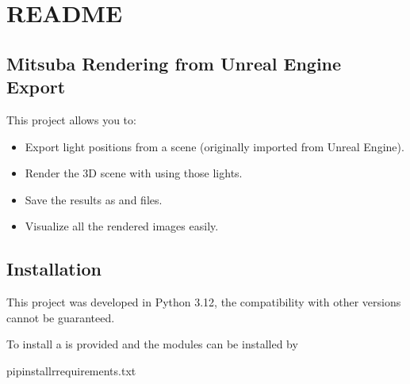 \documentclass[letterpaper,10pt,english]{sphinxmanual}
\begin{document}
\chapter{README}
\label{\detokenize{index:readme}}

\section{Mitsuba Rendering from Unreal Engine Export}
\label{\detokenize{index:mitsuba-rendering-from-unreal-engine-export}}
\sphinxAtStartPar
This project allows you to:
\begin{itemize}
\item {} 
\sphinxAtStartPar
Export light positions from a  scene (originally imported from Unreal Engine).

\item {} 
\sphinxAtStartPar
Render the 3D scene with  using those lights.

\item {} 
\sphinxAtStartPar
Save the results as  and  files.

\item {} 
\sphinxAtStartPar
Visualize all the rendered images easily.

\end{itemize}


\section{Installation}
\label{\detokenize{index:installation}}
\sphinxAtStartPar
This project was developed in Python 3.12, the compatibility with other versions cannot be guaranteed.

\sphinxAtStartPar
To install a  is provided and the modules can be installed by

\begin{sphinxVerbatim}[commandchars=\\\{\}]
pipinstall\PYGZhy{}rrequirements.txt
\end{sphinxVerbatim}
\end{document}
